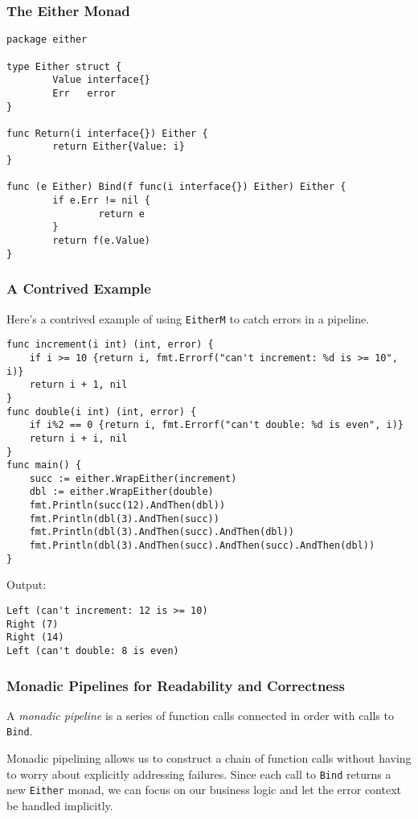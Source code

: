 \documentclass{beamer}
\begin{document}
\begin{frame}[fragile]
  \frametitle{The Either Monad}
\begin{lstlisting}[language=Golang]
package either

type Either struct {
        Value interface{}
        Err   error
}

func Return(i interface{}) Either {
        return Either{Value: i}
}

func (e Either) Bind(f func(i interface{}) Either) Either {
        if e.Err != nil {
                return e
        }
        return f(e.Value)
}
\end{lstlisting}
\end{frame}

\begin{frame}[fragile]
  \frametitle{A Contrived Example}
  Here's a contrived example of using {\tt EitherM} to catch errors in a pipeline.
\begin{lstlisting}[language=Golang]
func increment(i int) (int, error) {
    if i >= 10 {return i, fmt.Errorf("can't increment: %d is >= 10", i)}
    return i + 1, nil
}
func double(i int) (int, error) {
    if i%2 == 0 {return i, fmt.Errorf("can't double: %d is even", i)}
    return i + i, nil
}
func main() {
    succ := either.WrapEither(increment)
    dbl := either.WrapEither(double)
    fmt.Println(succ(12).AndThen(dbl))
    fmt.Println(dbl(3).AndThen(succ))
    fmt.Println(dbl(3).AndThen(succ).AndThen(dbl))
    fmt.Println(dbl(3).AndThen(succ).AndThen(succ).AndThen(dbl))
}
\end{lstlisting}
Output:
\begin{lstlisting}
Left (can't increment: 12 is >= 10)
Right (7)
Right (14)
Left (can't double: 8 is even)
\end{lstlisting}
\end{frame}

\begin{frame}
  \frametitle{Monadic Pipelines for Readability and Correctness}
  A \emph{monadic pipeline} is a series of function calls connected in order
  with calls to {\tt Bind}.

  \par\pause
  Monadic pipelining allows us to construct a chain of function calls
  without having to worry about explicitly addressing failures.  Since
  each call to {\tt Bind} returns a new {\tt Either} monad, we can
  focus on our business logic and let the error context be handled
  implicitly.
\end{frame}
\end{document}
